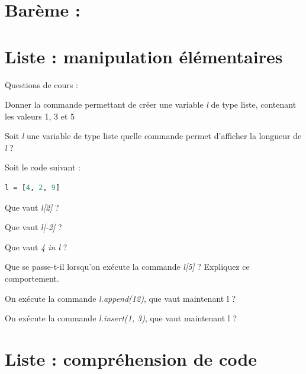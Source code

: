 \documentclass[a4paper, noanswers, addpoints, 12pt]{exam}
\begin{document}
\section*{Barème :}
\begin{center}
  \par\bigskip
  \gradetable[h]
\end{center}
\begin{questions}


\section{Liste : manipulation élémentaires}

\question[4] Questions de cours :
\begin{parts}
    \item Donner la commande permettant de créer une variable \textit{l} de type liste, contenant les valeurs 1, 3 et 5
    \item Soit \textit{l} une variable de type liste quelle commande permet d'afficher la longueur de \textit{l} ?
    \item Soit le code suivant :
\begin{lstlisting}[language=Python]
l = [4, 2, 9]    
\end{lstlisting}
Que vaut \textit{l[2]} ?
    \item Que vaut \textit{l[-2]} ?
    \item Que vaut \textit{4 in l} ?
    \item Que se passe-t-il lorsqu'on exécute la commande \textit{l[5]} ? Expliquez ce comportement.
    \item On exécute la commande \textit{l.append(12)}, que vaut maintenant l ?
    \item On exécute la commande \textit{l.insert(1, 3)}, que vaut maintenant l ?
\end{parts}

\section{Liste : compréhension de code}


\end{questions}
\end{document}
